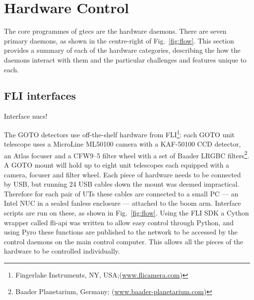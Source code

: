 \section{Hardware Control}
\label{sec:hardware_control}
\begin{colsection}


\begin{colsection}

The core programmes of \gls{gtecs} are the hardware daemons. There are seven primary daemons, as shown in the centre-right of Fig.~\ref{fig:flow}. This section provides a summary of each of the hardware categories, describing the how the daemons interact with them and the particular challenges and features unique to each.

\end{colsection}


\subsection{FLI interfaces}
\label{sec:fli}
\begin{colsection}

Interface \glspl{nuc}!

The GOTO detectors use off-the-shelf hardware from FLI\footnote{Fingerlake Instruments, NY, USA;\@ (\url{www.flicamera.com})}: each GOTO unit telescope uses a MicroLine ML50100 camera with a KAF-50100 CCD detector, an Atlas focuser and a CFW9--5 filter wheel with a set of Baader LRGBC filters\footnote{Baader Planetarium, Germany; (\url{www.baader-planetarium.com})}. A GOTO mount will hold up to eight unit telescopes each equipped with a camera, focuser and filter wheel. Each piece of hardware needs to be connected by USB, but running 24 USB cables down the mount was deemed impractical. Therefore for each pair of UTs these cables are connected to a small PC --- an Intel NUC in a sealed fanless enclosure --- attached to the boom arm. Interface scripts are run on these, as shown in Fig.~\ref{fig:flow}. Using the FLI SDK a Cython wrapper called \textsf{fli-api} was written to allow easy control through Python, and using \textsf{Pyro} these functions are published to the network to be accessed by the control daemons on the main control computer. This allows all the pieces of the hardware to be controlled individually.


\end{colsection}
\end{colsection}
